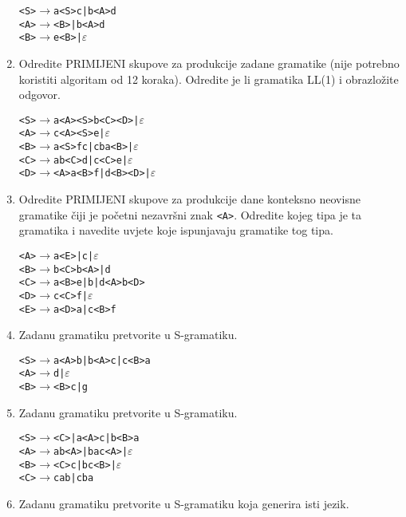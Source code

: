 \documentclass[times, 12pt, utf8]{book}
\begin{document}
\begin{enumerate}[resume]
\begin{alltt}
<S> \(\to\) a<S>c | b<A>d
<A> \(\to\) <B> | b<A>d
<B> \(\to\) e<B> | \(\varepsilon\)
\end{alltt} 

\item
Odredite PRIMIJENI skupove za produkcije zadane gramatike (nije potrebno koristiti algoritam od 12 koraka).
Odredite je li gramatika LL(1) i obrazložite odgovor. \cite[str.~100]{udzbenik}

\begin{alltt}
<S> \(\to\) a<A><S>b<C><D> | \(\varepsilon\)
<A> \(\to\) c<A><S>e | \(\varepsilon\)
<B> \(\to\) a<S>fc | cba<B> | \(\varepsilon\)
<C> \(\to\) ab<C>d | c<C>e | \(\varepsilon\)
<D> \(\to\) <A>a<B>f | d<B><D> | \(\varepsilon\)
\end{alltt} 

\item
Odredite PRIMIJENI skupove za produkcije dane konteksno neovisne gramatike čiji je početni nezavršni znak \texttt{<A>}.
Odredite kojeg tipa je ta gramatika i navedite uvjete koje ispunjavaju gramatike tog tipa. \cite[str.~85-115]{udzbenik}

\begin{alltt}
<A> \(\to\) a<E> | c | \(\varepsilon\)
<B> \(\to\) b<C>b<A> | d
<C> \(\to\) a<B>e | b | d<A>b<D>
<D> \(\to\) c<C>f | \(\varepsilon\)
<E> \(\to\) a<D>a | c<B>f
\end{alltt} 

\item 
Zadanu gramatiku pretvorite u S-gramatiku. \cite[str.~85]{udzbenik} \cite{auditorne}

\begin{alltt}
<S> \(\to\) a<A>b | b<A>c | c<B>a
<A> \(\to\) d | \(\varepsilon\)
<B> \(\to\) <B>c | g
\end{alltt} 

\item
Zadanu gramatiku pretvorite u S-gramatiku. \cite[str.~85]{udzbenik} \cite{auditorne}

\begin{alltt}
<S> \(\to\) <C> | a<A>c | b<B>a
<A> \(\to\) ab<A> | bac<A> | \(\varepsilon\)
<B> \(\to\) <C>c | bc<B> | \(\varepsilon\)
<C> \(\to\) cab | cba
\end{alltt} 

\item
Zadanu gramatiku pretvorite u S-gramatiku koja generira isti jezik. \cite[str.~85]{udzbenik} \cite{auditorne}


\end{enumerate}
\end{document}
